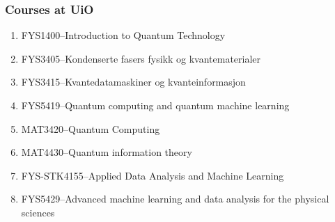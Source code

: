\documentclass{beamer}
\begin{document}
\begin{frame}
\frametitle{Courses at UiO}

\begin{block}{}
\begin{enumerate}
\item FYS1400--Introduction to Quantum Technology
\item FYS3405--Kondenserte fasers fysikk og kvantematerialer
\item FYS3415--Kvantedatamaskiner og kvanteinformasjon
\item FYS5419--Quantum computing and quantum machine learning
\item MAT3420--Quantum Computing
\item MAT4430--Quantum information theory
\item FYS-STK4155--Applied Data Analysis and Machine Learning
\item FYS5429--Advanced machine learning and data analysis for the physical sciences
\end{enumerate}

\end{block}
\end{frame}
\end{document}
